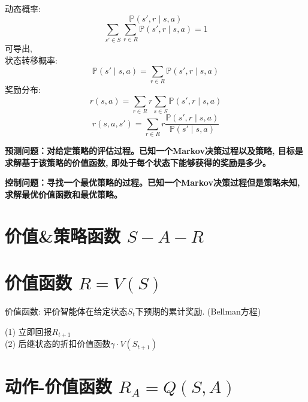         动态概率:
            $$\mathbb{P}(s', r \mid s, a)$$
            $$\sum_{s' \in S} \sum_{r \in R} \mathbb{P}(s', r \mid s, a) = 1$$
        可导出,\\
        状态转移概率:
            $$\mathbb{P}(s' \mid s,a) = \sum_{r \in R} \mathbb{P}(s', r \mid s, a)$$
        奖励分布:
            $$r(s, a) = \sum_{r \in R} r \sum_{s \in S} \mathbb{P}(s', r \mid s, a)$$
            $$r(s, a, s') = \sum_{r \in R} r \frac{\mathbb{P}(s', r \mid s, a)}{\mathbb{P}(s' \mid s, a)}$$
            
        \bf{预测问题}：对给定策略的评估过程。已知一个Markov决策过程以及策略, 目标是求解基于该策略的价值函数, 即处于每个状态下能够获得的奖励是多少。
        
        \bf{控制问题}：寻找一个最优策略的过程。已知一个Markov决策过程但是策略未知, 求解最优价值函数和最优策略。

        
    \section{价值\&策略函数 $S-A-R$}
        \section{价值函数 $R = V(S)$}
            价值函数: 评价智能体在给定状态$S_t$下预期的累计奖励. (Bellman方程)

            (1) 立即回报$R_{t+1}$\\
        	(2) 后继状态的折扣价值函数$\gamma \cdot V(S_{t+1})$
        
        \section{动作-价值函数 $R_A = Q(S,A)$}
            
